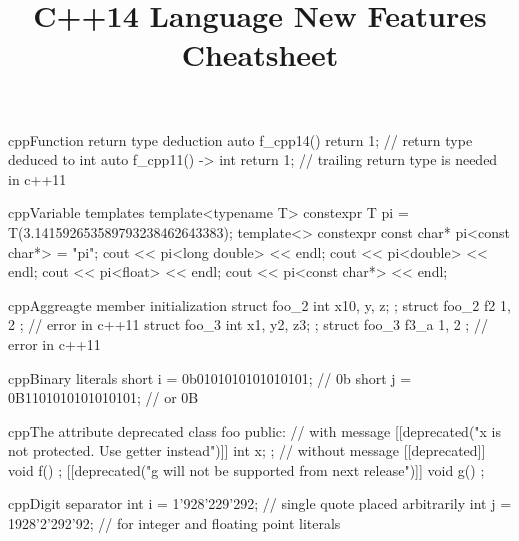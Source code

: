 \documentclass[10pt,a4paper]{article}
\title{\color{w3schools}C++14 Language New Features Cheatsheet
}
\begin{document}
\maketitle

\small
\begin{multicols}{3}

\thispagestyle{empty}
\scriptsize



\begin{codebox}{cpp}{Function return type deduction}
auto f_cpp14() { return 1; } // return type deduced to int
auto f_cpp11() -> int { return 1; } // trailing return type is needed in c++11

\end{codebox}

\begin{codebox}{cpp}{Variable templates}
template<typename T>
constexpr T pi = T(3.141592653589793238462643383);
template<>
constexpr const char* pi<const char*> = "pi";
cout << pi<long double> << endl;
cout << pi<double> << endl;
cout << pi<float> << endl;
cout << pi<const char*> << endl;

\end{codebox}

\begin{codebox}{cpp}{Aggreagte member initialization}
struct foo_2 {
  int x{10}, y, z;
};
struct foo_2 f2 { 1, 2 }; // error in c++11
struct foo_3 {
  int x{1}, y{2}, z{3};
};
struct foo_3 f3_a { 1, 2 }; // error in c++11

\end{codebox}

\begin{codebox}{cpp}{Binary literals}
short i = 0b0101010101010101; // 0b
short j = 0B1101010101010101; // or 0B

\end{codebox}

\begin{codebox}{cpp}{The attribute deprecated}
class foo
{
public:
  // with message
  [[deprecated("x is not protected. Use getter instead")]]
  int x;
};
// without message
[[deprecated]] void f() {};
[[deprecated("g will not be supported from next release")]] void g() {};

\end{codebox}

\begin{codebox}{cpp}{Digit separator}
int i = 1'928'229'292; // single quote placed arbitrarily
int j = 1928'2'292'92; // for integer and floating point literals


\end{codebox}
\end{multicols}
\end{document}

